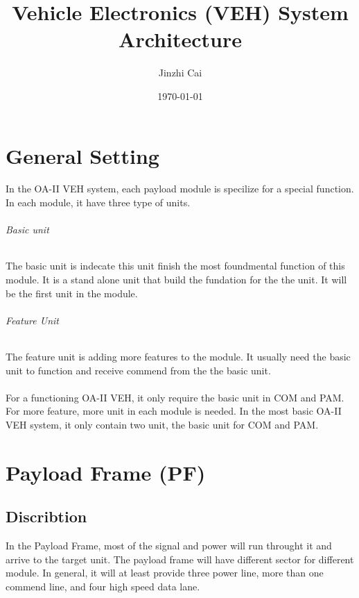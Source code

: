 \documentclass[12pt,article]{memoir}
\title{Vehicle Electronics (VEH) System Architecture}
\author{Jinzhi Cai}
\date{\today}
\begin{document}
	


\tableofcontents*
\clearpage

\chapter{General Setting}
	In the OA-II VEH system, each payload module is specilize for a special function. In each module, it have three type of units.
\subparagraph{Basic unit}%
The basic unit is indecate this unit finish the most foundmental function of this module. It is a stand alone unit that build the fundation for the the unit. It will be the first unit in the module. 
\subparagraph{Feature Unit}%
The feature unit is adding more features to the module. It usually need the basic unit to function and receive commend from the the basic unit.\\\\
For a functioning OA-II VEH, it only require the basic unit in COM and PAM. For more feature, more unit in each module is needed. In the most basic OA-II VEH system, it only contain two unit, the basic unit for COM and PAM.
\newpage
\chapter{Payload Frame (PF)}
\section{Discribtion}
In the Payload Frame, most of the signal and power will run throught it and arrive to the target unit. The payload frame will have different sector for different module. In general, it will at least provide three power line, more than one commend line, and four high speed data lane.
\end{document}

